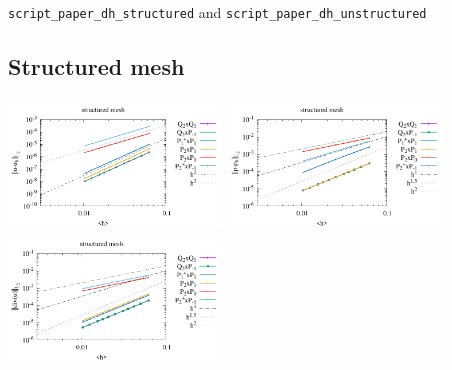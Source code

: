 {\tt script\_paper\_dh\_structured} and {\tt script\_paper\_dh\_unstructured}


\subsection*{Structured mesh}

\begin{center}
\includegraphics[width=5.7cm]{python_codes/fieldstone_120/paperresults/dh_structured_errorsV.pdf}
\includegraphics[width=5.7cm]{python_codes/fieldstone_120/paperresults/dh_structured_errorsP.pdf}
\includegraphics[width=5.7cm]{python_codes/fieldstone_120/paperresults/dh_structured_errors_divv.pdf}\\
\end{center}

